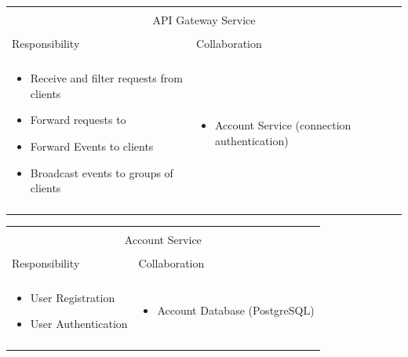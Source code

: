 \begin{tabular}{|l|l|}
    \cline{1-2}
    \multicolumn{2}{|c|}{} \\[-0.3cm]
    \multicolumn{2}{|c|}{API Gateway Service} \\ 
    \multicolumn{2}{|c|}{} \\[-0.3cm]
    \cline{1-2}
    Responsibility & Collaboration \\
    \cline{1-2}
    & \\[-0.2cm]
    \begin{minipage}{6.5cm}
        \begin{itemize}
          \item Receive and filter requests from clients
          \item Forward requests to \mss{}
          \item Forward Events to clients
          \item Broadcast events to groups of clients
        \end{itemize} 
    \end{minipage}
	&
    \begin{minipage}{6.5cm}
        \begin{itemize}
          \item Account Service (connection authentication)
        \end{itemize} 
    \end{minipage}
	\\ & \\
    \hline
\end{tabular}

\vspace{0.5cm}

\begin{tabular}{|l|l|}
    \cline{1-2}
    \multicolumn{2}{|c|}{} \\[-0.3cm]
    \multicolumn{2}{|c|}{Account Service} \\ 
    \multicolumn{2}{|c|}{} \\[-0.3cm]
    \cline{1-2}
    Responsibility & Collaboration \\
    \cline{1-2}
    & \\[-0.2cm]
    \begin{minipage}{6.5cm}
        \begin{itemize}
          \item User Registration
          \item User Authentication
        \end{itemize} 
    \end{minipage}
	&
    \begin{minipage}{6.5cm}
        \begin{itemize}
          \item Account Database (PostgreSQL)
        \end{itemize} 
    \end{minipage}
	\\ & \\
    \hline
\end{tabular}

